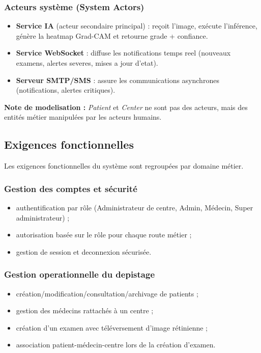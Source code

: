 \subsubsection*{Acteurs système (System Actors)}
\begin{itemize}
    \item \textbf{Service IA} (acteur secondaire principal) : reçoit l'image, exécute l'inférence,
    génère la heatmap Grad-CAM et retourne grade + confiance.
    \item \textbf{Service WebSocket} : diffuse les notifications temps reel (nouveaux examens, alertes severes,
    mises a jour d'etat).
    \item \textbf{Serveur SMTP/SMS} : assure les communications asynchrones (notifications, alertes critiques).
\end{itemize}

\textbf{Note de modelisation :} \textit{Patient} et \textit{Center} ne sont pas des acteurs,
mais des entités métier manipulées par les acteurs humains.

\subsection{Exigences fonctionnelles}
Les exigences fonctionnelles du système sont regroupées par domaine métier.

\subsubsection*{Gestion des comptes et sécurité}
\begin{itemize}
    \item authentification par rôle (Administrateur de centre, Admin, Médecin, Super administrateur) ;
    \item autorisation basée sur le rôle pour chaque route métier ;
    \item gestion de session et deconnexion sécurisée.
\end{itemize}

\subsubsection*{Gestion operationnelle du depistage}
\begin{itemize}
    \item création/modification/consultation/archivage de patients ;
    \item gestion des médecins rattachés à un centre ;
    \item création d'un examen avec téléversement d'image rétinienne ;
    \item association patient-médecin-centre lors de la création d'examen.
\end{itemize}

